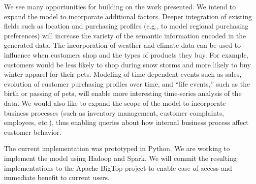\documentclass[conference]{IEEEtran}
\begin{document}
We see many opportunities for building on the work presented.  We intend to expand the model to incorporate additional factors.  Deeper integration of existing fields such as location and purchasing profiles (e.g., to model regional purchasing preferences) will increase the variety of the semantic information encoded in the generated data. The incorporation of weather and climate data can be used to influence when customers shop and the types of products they buy. For example, customers would be less likely to shop during snow storms and more likely to buy winter apparel for their pets. Modeling of time-dependent events such as sales, evolution of customer purchasing profiles over time, and ``life events,'' such as the birth or passing of pets, will enable more interesting time-series analysis of the data.  We would also like to expand the scope of the model to incorporate business processes (such as inventory management, customer complaints, employees, etc.), thus enabling queries about how internal business process affect customer behavior.

The current implementation was prototyped in Python.  We are working to implement the model using Hadoop and Spark.  We will commit the resulting implementations to the Apache BigTop project to enable ease of access and immediate benefit to current users. 



 


%
%
\end{document}
